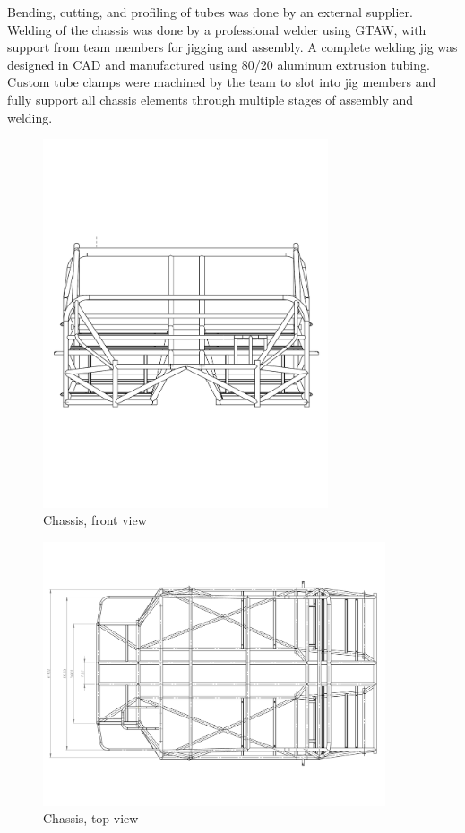 \documentclass[10pt]{article}
\begin{document}
Bending, cutting, and profiling of tubes was done by an external supplier. Welding of the chassis was done by a professional welder using GTAW, with support from team members for jigging and assembly. A complete welding jig was designed in CAD and manufactured using 80/20 aluminum extrusion tubing. Custom tube clamps were machined by the team to slot into jig members and fully support all chassis elements through multiple stages of assembly and welding.

\begin{figure}[H]
\centering
\includegraphics[width=0.75\textwidth]{figures/chassis-front}
\caption{Chassis, front view}
\label{fig:chassis-front}
\end{figure}

\begin{figure}[H]
\centering
\includegraphics[width=0.9\textwidth]{figures/chassis-top}
\caption{Chassis, top view}
\label{fig:chassis-top}
\end{figure}
\end{document}

